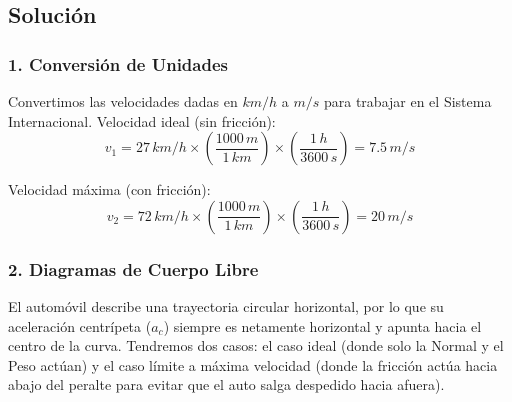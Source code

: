 \documentclass[12pt, a4paper]{article}
\begin{document}
\begin{center}
\end{center}

\subsection*{Solución}

\subsubsection*{1. Conversión de Unidades}
Convertimos las velocidades dadas en $\si{km/h}$ a $\si{m/s}$ para trabajar en el Sistema Internacional.
Velocidad ideal (sin fricción):
$$ v_1 = 27 \, \si{km/h} \times \left( \frac{1000 \, \si{m}}{1 \, \si{km}} \right) \times \left( \frac{1 \, \si{h}}{3600 \, \si{s}} \right) = 7.5 \, \si{m/s} $$

Velocidad máxima (con fricción):
$$ v_2 = 72 \, \si{km/h} \times \left( \frac{1000 \, \si{m}}{1 \, \si{km}} \right) \times \left( \frac{1 \, \si{h}}{3600 \, \si{s}} \right) = 20 \, \si{m/s} $$

\subsubsection*{2. Diagramas de Cuerpo Libre}
El automóvil describe una trayectoria circular horizontal, por lo que su aceleración centrípeta ($a_c$) siempre es netamente horizontal y apunta hacia el centro de la curva.
Tendremos dos casos: el caso ideal (donde solo la Normal y el Peso actúan) y el caso límite a máxima velocidad (donde la fricción actúa hacia abajo del peralte para evitar que el auto salga despedido hacia afuera).
\end{document}
